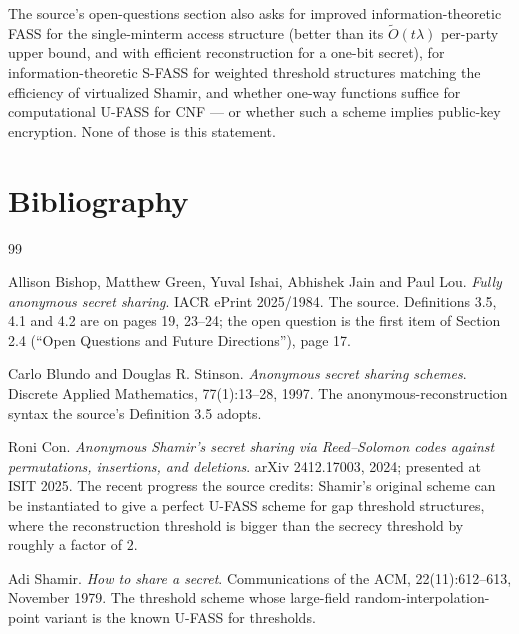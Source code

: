 \documentclass{aicr-conjecture}
\begin{document}
\begin{remark}
The source's open-questions section also asks for improved
information-theoretic FASS for the single-minterm access structure
(better than its $\widetilde{O}(t\lambda)$ per-party upper bound, and
with efficient reconstruction for a one-bit secret), for
information-theoretic S-FASS for weighted threshold structures matching
the efficiency of virtualized Shamir, and whether one-way functions
suffice for computational U-FASS for CNF --- or whether such a scheme
implies public-key encryption. None of those is this statement.
\end{remark}

\section{Bibliography}

\begin{aicrbibliography}{99}

Allison Bishop, Matthew Green, Yuval Ishai, Abhishek Jain and Paul Lou.
\emph{Fully anonymous secret sharing}.
IACR ePrint 2025/1984.
The source. Definitions 3.5, 4.1 and 4.2 are on pages 19, 23--24; the
open question is the first item of Section 2.4 (``Open Questions and
Future Directions''), page 17.

Carlo Blundo and Douglas R. Stinson.
\emph{Anonymous secret sharing schemes}.
Discrete Applied Mathematics, 77(1):13--28, 1997.
The anonymous-reconstruction syntax the source's Definition 3.5 adopts.

Roni Con.
\emph{Anonymous Shamir's secret sharing via Reed--Solomon codes against
permutations, insertions, and deletions}.
arXiv 2412.17003, 2024; presented at ISIT 2025.
The recent progress the source credits: Shamir's original scheme can be
instantiated to give a perfect U-FASS scheme for gap threshold
structures, where the reconstruction threshold is bigger than the secrecy
threshold by roughly a factor of $2$.

Adi Shamir.
\emph{How to share a secret}.
Communications of the ACM, 22(11):612--613, November 1979.
The threshold scheme whose large-field random-interpolation-point variant
is the known U-FASS for thresholds.

\end{aicrbibliography}
\end{document}
